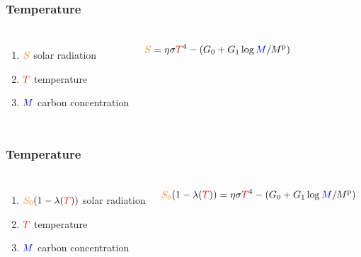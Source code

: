 \documentclass[pdf]{beamer}
\begin{document}
\begin{frame} \frametitle{Temperature}
    \begin{columns}
        \begin{enumerate}
            \item ${\color{orange} S}$ solar radiation
            \item ${\color{red} T}$ temperature
            \item ${\color{blue} M}$ carbon concentration
        \end{enumerate}
        \begin{equation*}
            {\color{orange} S} = \eta \sigma {\color{red} T}^4 - (G_0 + G_1 \log {\color{blue} M} / M^{\mathrm{p}})
        \end{equation*}
    \end{columns}
\end{frame}

\begin{frame} \frametitle{Temperature}
    \begin{columns}
        \begin{enumerate}
            \item ${\color{orange} S_0} (1 - \lambda({\color{red} T}))$ solar radiation
            \item ${\color{red} T}$ temperature
            \item ${\color{blue} M}$ carbon concentration
        \end{enumerate}
        \begin{equation*}
            {\color{orange} S_0} (1 - \lambda({\color{red} T})) = \eta \sigma {\color{red} T}^4 - (G_0 + G_1 \log {\color{blue} M} / M^{\mathrm{p}})
        \end{equation*}
    \end{columns}
\end{frame}
\end{document}
